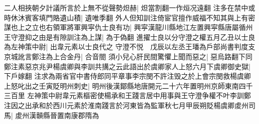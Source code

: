 二人相挾朝夕計議所言於上無不從聲勢炟赫|{
	炟當割翻一作烜况遠翻}
注多在禁中或時休沐賓客填門賂遺山積|{
	遺唯季翻}
外人但知訓注倚宦官擅作威福不知其與上有密謀也上之立也右領軍將軍興寜仇士良有功|{
	興寜漢龍川縣地江左置興寜縣唐屬循州}
王守澄抑之由是有隙訓注為上謀|{
	為于偽翻}
進擢士良以分守澄之權五月乙丑以士良為左神策中尉|{
	出韋元素以士良代之}
守澄不悦　戊辰以左丞王璠為戶部尚書判度支　京城訛言鄭注為上合金丹|{
	合音閤}
須小兒心肝民間驚懼上聞而惡之|{
	惡烏路翻下同}
鄭注素惡京兆尹楊虞卿與李訓共搆之云此語出於虞卿家人上怒六月下虞卿御史獄|{
	下戶嫁翻}
注求為兩省官中書侍郎同平章事李宗閔不許注毁之於上會宗閔救楊虞卿上怒叱出之壬寅貶明州刺史|{
	明州後漢鄮縣地唐開元二十六年置明州京師東南四千三百里}
左神策中尉韋元素樞密使楊承和王踐言居中用事與王守澄争權不叶李訓鄭注因之出承和於西川元素於淮南踐言於河東皆為監軍秋七月甲辰朔貶楊虞卿䖍州司馬|{
	䖍州漢贑縣晉置南康郡隋為}


